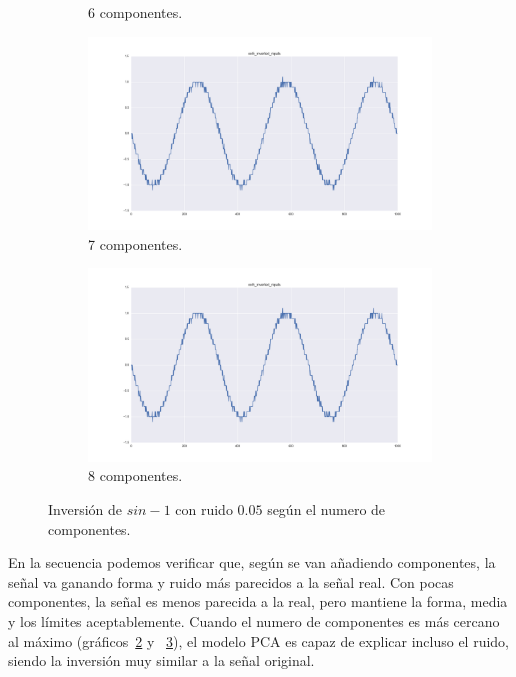 \documentclass[11pt,spanish,listoffigures,listoftables]{tfgetsinf}
\begin{document}
\begin{figure}[H]
\begin{subfigure}[h]{0.33\textwidth}
            \caption{6 componentes.}
            \label{fig:col5_inverted_nipals6}
        \end{subfigure}
        \begin{subfigure}[h]{0.33\textwidth}
            \centering
            \includegraphics[width=\textwidth]{simulated_data_8_columns/col5_inverted_nipals_7.png}
            \caption{7 componentes.}
            \label{fig:col5_inverted_nipals7}
        \end{subfigure}
        \begin{subfigure}[h]{0.33\textwidth}
            \centering
            \includegraphics[width=\textwidth]{simulated_data_8_columns/col5_inverted_nipals_8.png}
            \caption{8 componentes.}
            \label{fig:col5_inverted_nipals8}
        \end{subfigure}
        \caption{Inversión de \(sin - 1\) con ruido \(0.05\) según el numero de componentes.}
        \label{fig:col5_inverted_nipals_n_components}
    \end{figure}
    
    En la secuencia podemos verificar que, según se van añadiendo componentes, la señal va ganando forma y ruido más parecidos a la señal real. Con pocas componentes, la señal es menos parecida a la real, pero mantiene la forma, media y los límites aceptablemente. Cuando el numero de componentes es más cercano al máximo (gráficos~\ref{fig:col5_inverted_nipals7} y ~\ref{fig:col5_inverted_nipals8}), el modelo PCA es capaz de explicar incluso el ruido, siendo la inversión muy similar a la señal original. 
    
\end{document}

